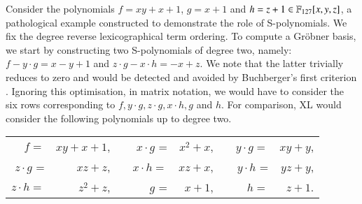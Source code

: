 \begin{example}
Consider the polynomials $f =xy + x + 1$, $g = x + 1$ and $h = z + 1 \in {\mathbb F}_{127}[x,y,z]$, a pathological example constructed to demonstrate the role of S-polynomials. We fix the degree reverse lexicographical term ordering. To compute a Gr\"obner basis, we start by constructing two S-polynomials of degree two, namely: $f - y\cdot g = x - y + 1$ and $z\cdot g - x\cdot h = -x + z$. We note that the latter trivially reduces to zero and would be detected and avoided by Buchberger's first criterion \cite{Cox1992}. Ignoring this optimisation, in matrix notation, we would have to consider the six rows corresponding to $f, y\cdot g, z\cdot g, x\cdot h, g$ and $h$.
For comparison, XL would consider the following polynomials up to degree two.
\begin{center}
\begin{tabular}{rrrrrr}
$f  =$ & $xy + x + 1$, & \ \ $x\cdot g$ = & $x^2 + x$, & \ \ $y\cdot g =$ & $xy + y$,\\
$z\cdot g$ = & $xz + z$,& \ \   $x\cdot h =$ & $xz + x$,    & \ \ $y\cdot h$ = & $yz + y$,\\
$z\cdot h =$ & $z^2 + z$,    & \ \ $g $ = & $x + 1$, & \ \ $h  =$ & $z + 1$.\\
\end{tabular}
\end{center}


\end{example}

